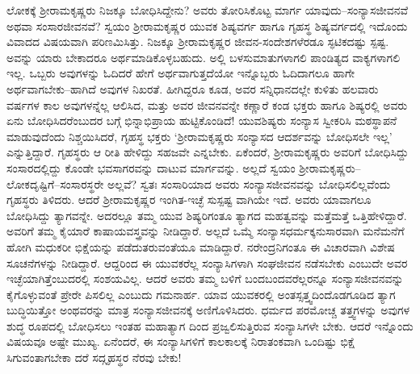 ಲೋಕಕ್ಕೆ ಶ್ರೀರಾಮಕೃಷ್ಣರು ನಿಜಕ್ಕೂ ಬೋಧಿಸಿದ್ದೇನು? ಅವರು ತೋರಿಸಿಕೊಟ್ಟ ಮಾರ್ಗ ಯಾವುದು–ಸಂನ್ಯಾಸಜೀವನವೆ ಅಥವಾ ಸಂಸಾರಜೀವನವೆ? ಸ್ವಯಂ ಶ್ರೀರಾಮಕೃಷ್ಣರ ಯುವಕ ಶಿಷ್ಯವರ್ಗ ಹಾಗೂ ಗೃಹಸ್ಥ ಶಿಷ್ಯವರ್ಗದಲ್ಲಿ ಇದೊಂದು ವಿವಾದದ ವಿಷಯವಾಗಿ ಪರಿಣಮಿಸಿತ್ತು. ನಿಜಕ್ಕೂ ಶ್ರೀರಾಮಕೃಷ್ಣರ ಜೀವನ-ಸಂದೇಶಗಳೆರಡೂ ಸ್ಫಟಿಕದಷ್ಟು ಸ್ಪಷ್ಟ. ಅವನ್ನು ಯಾರು ಬೇಕಾದರೂ ಅರ್ಥಮಾಡಿಕೊಳ್ಳಬಹುದು. ಅಲ್ಲಿ ಬಳಸುಮಾತುಗಳಾಗಲಿ ಪಾಂಡಿತ್ಯದ ವಾಕ್ಯಗಳಾಗಲಿ ಇಲ್ಲ. ಒಬ್ಬರು ಅವುಗಳನ್ನು ಓದಿದರೆ ಹೇಗೆ ಅರ್ಥವಾಗುತ್ತದೆಯೋ ಇನ್ನೊಬ್ಬರು ಓದಿದಾಗಲೂ ಹಾಗೇ ಅರ್ಥವಾಗಬೇಕು–ಹಾಗಿದೆ ಅವುಗಳ ನಿಖರತೆ. ಹೀಗಿದ್ದರೂ ಕೂಡ, ಅವರ ಸನ್ನಿಧಾನದಲ್ಲೇ ಕುಳಿತು ಹಲವಾರು ವರ್ಷಗಳ ಕಾಲ ಅವುಗಳನ್ನೆಲ್ಲ ಆಲಿಸಿದ, ಮತ್ತು ಅವರ ಜೀವನವನ್ನೇ ಕಣ್ಣಾರೆ ಕಂಡ ಭಕ್ತರು ಹಾಗೂ ಶಿಷ್ಯರಲ್ಲಿ ಅವರು ಏನು ಬೋಧಿಸಿದರೆಂಬುದರ ಬಗ್ಗೆ ಭಿನ್ನಾಭಿಪ್ರಾಯ ಹುಟ್ಟಿಕೊಂಡಿದೆ! ಯುವಶಿಷ್ಯರು ಸಂನ್ಯಾಸ ಸ್ವೀಕರಿಸಿ ಮಠಸ್ಥಾಪನೆ ಮಾಡುವುದೆಂದು ನಿಶ್ಚಯಿಸಿದರೆ, ಗೃಹಸ್ಥ ಭಕ್ತರು ‘ಶ್ರೀರಾಮಕೃಷ್ಣರು ಸಂನ್ಯಾಸದ ಆದರ್ಶವನ್ನು ಬೋಧಿಸಲೇ ಇಲ್ಲ’ ಎನ್ನುತ್ತಿದ್ದಾರೆ. ಗೃಹಸ್ಥರು ಆ ರೀತಿ ಹೇಳಿದ್ದು ಸಹಜವೇ ಎನ್ನಬೇಕು. ಏಕೆಂದರೆ, ಶ್ರೀರಾಮಕೃಷ್ಣರು ಅವರಿಗೆ ಬೋಧಿಸಿದ್ದು ಸಂಸಾರದಲ್ಲಿದ್ದು ಕೊಂಡೇ ಭವಸಾಗರವನ್ನು ದಾಟುವ ಮಾರ್ಗವನ್ನು. ಅಲ್ಲದೆ ಸ್ವಯಂ ಶ್ರೀರಾಮಕೃಷ್ಣರು– ಲೋಕದೃಷ್ಟಿಗೆ–ಸಂಸಾರಸ್ಥರೇ ಅಲ್ಲವೆ? ಸ್ವತಃ ಸಂಸಾರಿಯಾದ ಅವರು ಸಂನ್ಯಾಸಜೀವನವನ್ನು ಬೋಧಿಸಲಿಲ್ಲವೆಂದು ಗೃಹಸ್ಥರು ತಿಳಿದರು. ಆದರೆ ಶ್ರೀರಾಮಕೃಷ್ಣರ ಇಂಗಿತ-ಇಚ್ಛೆ ಸುಸ್ಪಷ್ಟ ವಾಗಿಯೇ ಇದೆ. ಅವರು ಯಾವಾಗಲೂ ಬೋಧಿಸಿದ್ದು ತ್ಯಾಗವನ್ನೇ. ಅದರಲ್ಲೂ ತಮ್ಮ ಯುವ ಶಿಷ್ಯರಿಗಂತೂ ತ್ಯಾಗದ ಮಹತ್ವವನ್ನು ಮತ್ತೆಮತ್ತೆ ಒತ್ತಿಹೇಳಿದ್ದಾರೆ. ಅವರಿಗೆ ತಮ್ಮ ಕೈಯಾರೆ ಕಾಷಾಯವಸ್ತ್ರವನ್ನು ನೀಡಿದ್ದಾರೆ. ಅಲ್ಲದೆ ಒಮ್ಮೆ ಸಂನ್ಯಾಸಧರ್ಮಕ್ಕನುಸಾರವಾಗಿ ಮನೆಮನೆಗೆ ಹೋಗಿ ಮಧುಕರೀ ಭಿಕ್ಷೆಯನ್ನು ಪಡೆದುತರುವಂತೆಯೂ ಮಾಡಿದ್ದಾರೆ. ನರೇಂದ್ರನಿಗಂತೂ ಈ ವಿಚಾರವಾಗಿ ವಿಶೇಷ ಸೂಚನೆಗಳನ್ನು ನೀಡಿದ್ದಾರೆ. ಆದ್ದರಿಂದ ಈ ಯುವಕರೆಲ್ಲ ಸಂನ್ಯಾಸಿಗಳಾಗಿ ಸಂಘಜೀವನ ನಡೆಸಬೇಕು ಎಂಬುದೇ ಅವರ ಇಚ್ಛೆಯಾಗಿತ್ತೆಂಬುದರಲ್ಲಿ ಸಂಶಯವಿಲ್ಲ. ಆದರೆ ಅವರು ತಮ್ಮ ಬಳಿಗೆ ಬಂದಬಂದವರೆಲ್ಲರನ್ನೂ ಸಂನ್ಯಾಸಜೀವನವನ್ನು ಕೈಗೊಳ್ಳುವಂತೆ ಪ್ರೇರೇ ಪಿಸಲಿಲ್ಲ ಎಂಬುದು ಗಮನಾರ್ಹ. ಯಾವ ಯುವಕರಲ್ಲಿ ಅಂತಸ್ಸತ್ತ್ವದಿಂದೊಡಗೂಡಿದ ತ್ಯಾಗ ಬುದ್ಧಿಯಿತ್ತೋ ಅಂಥವರನ್ನು ಮಾತ್ರ ಸಂನ್ಯಾಸಜೀವನಕ್ಕೆ ಅಣಿಗೊಳಿಸಿದರು. ಧರ್ಮದ ಪರಮೋಚ್ಚ ತತ್ತ್ವಗಳನ್ನು ಅವುಗಳ ಶುದ್ಧ ರೂಪದಲ್ಲಿ ಬೋಧಿಸಲು ಇಂತಹ ಮಹಾತ್ಯಾಗ ದಿಂದ ಪ್ರಜ್ವಲಿಸುತ್ತಿರುವ ಸಂನ್ಯಾಸಿಗಳೇ ಬೇಕು. ಆದರೆ ಇನ್ನೊಂದು ವಿಷಯವೂ ಅಷ್ಟೇ ಮುಖ್ಯ. ಏನೆಂದರೆ, ಈ ಸಂನ್ಯಾಸಿಗಳಿಗೆ ಕಾಲಕಾಲಕ್ಕೆ ನಿರಾತಂಕವಾಗಿ ಒಂದಿಷ್ಟು ಭಿಕ್ಷೆ ಸಿಗುವಂತಾಗಬೇಕಾ ದರೆ ಸದ್ಗೃಹಸ್ಥರ ನೆರವು ಬೇಕು! 

